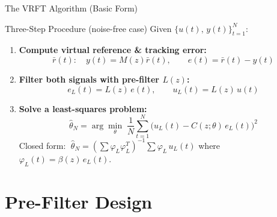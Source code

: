 \documentclass[aspectratio=169]{beamer}
\begin{document}
\begin{frame}{The VRFT Algorithm (Basic Form)}
  \begin{block}{Three-Step Procedure \quad (noise-free case)}
    Given $\{u(t),\, y(t)\}_{t=1}^{N}$:
    \begin{enumerate}
      \setlength{\itemsep}{0.6em}
      \item \textbf{Compute virtual reference \& tracking error:}
        \[ \bar{r}(t): \quad y(t)=M(z)\bar{r}(t), \qquad e(t)=\bar{r}(t)-y(t) \]
      \item \textbf{Filter both signals with pre-filter $L(z)$:}
        \[ e_L(t) = L(z)\,e(t), \qquad u_L(t) = L(z)\,u(t) \]
      \item \textbf{Solve a least-squares problem:}
        \[ \hat{\theta}_N = \arg\min_\theta \; \frac{1}{N}\sum_{t=1}^{N}\bigl(u_L(t) - C(z;\theta)\,e_L(t)\bigr)^2 \]
        Closed form: $\;\hat{\theta}_N = \left(\sum \varphi_L\varphi_L^T\right)^{-1}\sum \varphi_L\, u_L(t)$
        \quad where $\varphi_L(t)=\beta(z)\,e_L(t)$.
    \end{enumerate}
  \end{block}
\end{frame}

\section{Pre-Filter Design}
\end{document}
